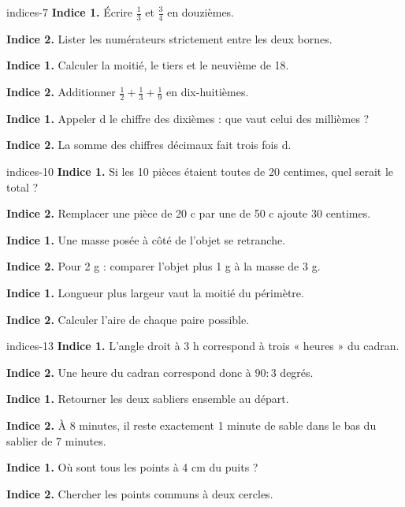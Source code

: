 \begin{blocEdition}{indices-7}
\textbf{Indice 1.} Écrire $\frac13$ et $\frac34$ en douzièmes.\par\medskip\textbf{Indice 2.} Lister les numérateurs strictement entre les deux bornes.\par
{}\textbf{Indice 1.} Calculer la moitié, le tiers et le neuvième de 18.\par\medskip\textbf{Indice 2.} Additionner $\frac12+\frac13+\frac19$ en dix-huitièmes.\par
{}\textbf{Indice 1.} Appeler d le chiffre des dixièmes : que vaut celui des millièmes ?\par\medskip\textbf{Indice 2.} La somme des chiffres décimaux fait trois fois d.\par

\end{blocEdition}
\begin{blocEdition}{indices-10}
\textbf{Indice 1.} Si les 10 pièces étaient toutes de 20 centimes, quel serait le total ?\par\medskip\textbf{Indice 2.} Remplacer une pièce de 20 c par une de 50 c ajoute 30 centimes.\par
{}\textbf{Indice 1.} Une masse posée à côté de l’objet se retranche.\par\medskip\textbf{Indice 2.} Pour 2 g : comparer l’objet plus 1 g à la masse de 3 g.\par
{}\textbf{Indice 1.} Longueur plus largeur vaut la moitié du périmètre.\par\medskip\textbf{Indice 2.} Calculer l’aire de chaque paire possible.\par

\end{blocEdition}
\begin{blocEdition}{indices-13}
\textbf{Indice 1.} L’angle droit à 3 h correspond à trois « heures » du cadran.\par\medskip\textbf{Indice 2.} Une heure du cadran correspond donc à $90:3$ degrés.\par
{}\textbf{Indice 1.} Retourner les deux sabliers ensemble au départ.\par\medskip\textbf{Indice 2.} À 8 minutes, il reste exactement 1 minute de sable dans le bas du sablier de 7 minutes.\par
{}\textbf{Indice 1.} Où sont tous les points à 4 cm du puits ?\par\medskip\textbf{Indice 2.} Chercher les points communs à deux cercles.\par

\end{blocEdition}
